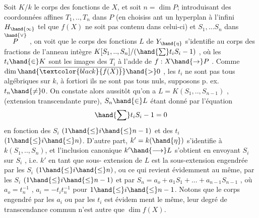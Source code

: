 
 Soit $K/k$ le corps des fonctions de $X$, et soit $n=\dim P$;
introduisant des coordonnées  affines $T_1,..,T_n$ dans $P$ (en choisiss
ant un hyperplan à l'infini $H_\hand{\infty}$ tel que $f(X)$ ne soit pas contenu dans
celui-ci) et $S_1,...S_n$ dans $\overset{\hand{\vee}}{P}$ , on voit que le corps des fonctions $L$
de $Y_{\hand{\eta}}$  s'identifie au corps des fractions de l'anneau intègre
$K[S_1,..,S_n]/(\hand{\sum} t_iS_i - 1)$ , où les $t_i \hand{\in} K$ sont les images des $T_i$ à
l'adde de $f:X\hand{\to} P$ . Comme $\dim \hand{\overline{\textcolor{black}{f(X)}}} \hand{>} 0$ , les $t_i$ ne sont pas tous
algébriques sur $k$, à fortiori ils ne sont pas tous nuls, supposons
p. ex. $t_n \hand{\neq} 0$. On constate alors aussitôt qu'on a $L = K(S_1,..,S_{n-1})$ ,
(extension transcendante pure), $S_n\hand{\in} L$ étant donné par l'équation
\[ \hand{\sum} t_iS_i - 1 = 0 \]
en fonction des $S_i$ $(1\hand{\leq} i\hand{\leq} n-1)$ et des $t_i$ $(1\hand{\leq} i\hand{\leq} n)$. D'autre part,
$k' = k(\hand{\eta})$ s'identifie à $k(S_1,..,S_n)$, et l'inclusion canonique
$k'\hand{\longrightarrow} L$ s'obtient en envoyant $S_i$ sur $S_i$ , i.e. $k'$ en tant que sous-%
extension de $L$ est la sous-extension engendrée par les $S_i$ $(1\hand{\leq} i\hand{\leq} n)$, ou
ce qui revient évidemment au même, par les $S_i$ $(1\hand{\leq} i\hand{\leq} n-1)$ et par
$S_n = a_o + a_1S_1 + \ldots + a_{n-1}S_{n-1}$ , où $a_o = t_n^{-1}$ , $a_i =-t_it_n^{-1}$ pour
$1\hand{\leq} i\hand{\leq} n-1$. Notons que le corps engendré par les $a_i$ ou par les $t_i$ est évidem
ment le même, leur degré de transcendance commun
n'est autre que $\dim f(X)$.


